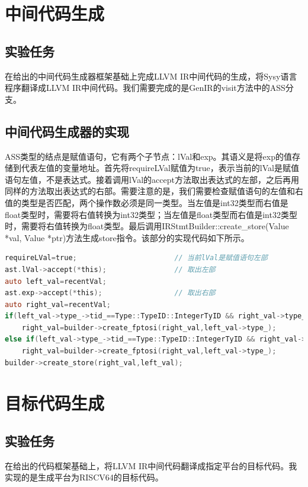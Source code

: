 \documentclass[supercite]{Experimental_Report}
\theoremstyle{definition}
\begin{document}
\section{中间代码生成}
\subsection{实验任务}
在给出的中间代码生成器框架基础上完成LLVM IR中间代码的生成，将Sysy语言程序翻译成LLVM IR中间代码。我们需要完成的是GenIR的visit方法中的ASS分支。
\subsection{中间代码生成器的实现}
ASS类型的结点是赋值语句，它有两个子节点：lVal和exp。其语义是将exp的值存储到代表左值的变量地址。首先将requireLVal赋值为true，表示当前的lVal是赋值语句左值，不是表达式。接着调用lVal的accept方法取出表达式的左部，之后再用同样的方法取出表达式的右部。需要注意的是，我们需要检查赋值语句的左值和右值的类型是否匹配，两个操作数必须是同一类型。当左值是int32类型而右值是float类型时，需要将右值转换为int32类型；当左值是float类型而右值是int32类型时，需要将右值转换为float类型。最后调用IRStmtBuilder::create\_store(Value *val, Value *ptr)方法生成store指令。该部分的实现代码如下所示。

\begin{lstlisting}[float=htb,language=C]
requireLVal=true;                       // 当前lVal是赋值语句左部
ast.lVal->accept(*this);                // 取出左部
auto left_val=recentVal;
ast.exp->accept(*this);                 // 取出右部
auto right_val=recentVal;
if(left_val->type_->tid_==Type::TypeID::IntegerTyID && right_val->type_->tid_==Type::TypeID::FloatTyID)
    right_val=builder->create_fptosi(right_val,left_val->type_);
else if(left_val->type_->tid_==Type::TypeID::IntegerTyID && right_val->type_->tid_==Type::TypeID::FloatTyID)
    right_val=builder->create_fptosi(right_val,left_val->type_);
builder->create_store(right_val,left_val);
\end{lstlisting}

\newpage
\section{目标代码生成}
\subsection{实验任务}
在给出的代码框架基础上，将LLVM IR中间代码翻译成指定平台的目标代码。我实现的是生成平台为RISCV64的目标代码。
\end{document}
